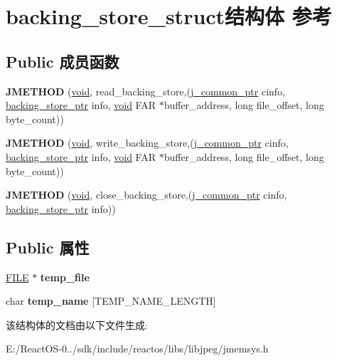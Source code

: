 \hypertarget{structbacking__store__struct}{}\section{backing\+\_\+store\+\_\+struct结构体 参考}
\label{structbacking__store__struct}
\subsection*{Public 成员函数}
\begin{DoxyCompactItemize}
\item 
\mbox{\label{structbacking__store__struct_a22c5a1f420b61a5c3f48e857d61ceb35}} 
{\bfseries J\+M\+E\+T\+H\+OD} (\hyperlink{interfacevoid}{void}, read\+\_\+backing\+\_\+store,(\hyperlink{structjpeg__common__struct}{j\+\_\+common\+\_\+ptr} cinfo, \hyperlink{structbacking__store__struct}{backing\+\_\+store\+\_\+ptr} info, \hyperlink{interfacevoid}{void} F\+AR $\ast$buffer\+\_\+address, long file\+\_\+offset, long byte\+\_\+count))
\item 
\mbox{\label{structbacking__store__struct_aa54343491f740a9d799eeb9c3e7e09d2}} 
{\bfseries J\+M\+E\+T\+H\+OD} (\hyperlink{interfacevoid}{void}, write\+\_\+backing\+\_\+store,(\hyperlink{structjpeg__common__struct}{j\+\_\+common\+\_\+ptr} cinfo, \hyperlink{structbacking__store__struct}{backing\+\_\+store\+\_\+ptr} info, \hyperlink{interfacevoid}{void} F\+AR $\ast$buffer\+\_\+address, long file\+\_\+offset, long byte\+\_\+count))
\item 
\mbox{\label{structbacking__store__struct_a509740a807e120959a02d25ac245eea4}} 
{\bfseries J\+M\+E\+T\+H\+OD} (\hyperlink{interfacevoid}{void}, close\+\_\+backing\+\_\+store,(\hyperlink{structjpeg__common__struct}{j\+\_\+common\+\_\+ptr} cinfo, \hyperlink{structbacking__store__struct}{backing\+\_\+store\+\_\+ptr} info))
\end{DoxyCompactItemize}
\subsection*{Public 属性}
\begin{DoxyCompactItemize}
\item 
\mbox{\label{structbacking__store__struct_a90903f2f62f4fe65ac65599b50d0411e}} 
\hyperlink{struct__iobuf}{F\+I\+LE} $\ast$ {\bfseries temp\+\_\+file}
\item 
\mbox{\label{structbacking__store__struct_aee24b7268410bcf129e83a8e2a2f4d45}} 
char {\bfseries temp\+\_\+name} \mbox{[}T\+E\+M\+P\+\_\+\+N\+A\+M\+E\+\_\+\+L\+E\+N\+G\+TH\mbox{]}
\end{DoxyCompactItemize}


该结构体的文档由以下文件生成\+:\begin{DoxyCompactItemize}
\item 
E\+:/\+React\+O\+S-\/0../sdk/include/reactos/libs/libjpeg/jmemsys.\+h\end{DoxyCompactItemize}
